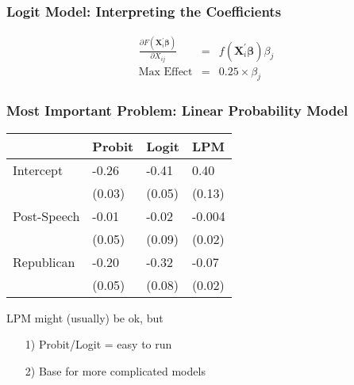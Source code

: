 \documentclass{beamer}
\begin{document}
\begin{frame}
\frametitle{Logit Model: Interpreting the Coefficients}

\begin{eqnarray}
\frac{\partial F(\boldsymbol{X}_{i}^{'}\boldsymbol{\beta} ) }{\partial X_{ij}  } & = & f(\boldsymbol{X}_{i}^{'} \boldsymbol{\beta})\beta_{j} \nonumber \\
\text{Max Effect} & = & 0.25 \times \beta_{j} \nonumber
\end{eqnarray}


\end{frame}


\begin{frame}
\frametitle{Most Important Problem: Linear Probability Model}

\begin{tabular}{llll}
	\hline
	&  Probit & Logit & LPM \\
\hline
Intercept & -0.26  & -0.41 & 0.40 \\
		  & (0.03) & (0.05) & (0.13) \\
Post-Speech & -0.01 & -0.02 & -0.004\\
			& (0.05) & (0.09) & (0.02) \\
Republican & -0.20   &  -0.32 & -0.07\\
			& (0.05)  &  (0.08) & (0.02) \\
\hline
\end{tabular}

LPM might (usually) be ok, but
\begin{itemize}
\item[1)] Probit/Logit  = easy to run
\item[2)] Base for more complicated models
\end{itemize}

\end{frame}
\end{document}
